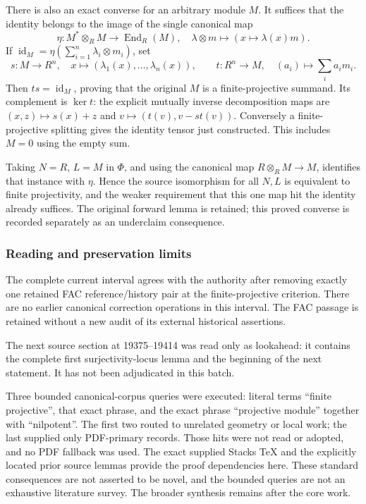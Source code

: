 There is also an exact converse for an arbitrary module \(M\). It suffices that the identity belongs to the image of the single canonical map \[
\eta:M^*\otimes_RM\longrightarrow\operatorname{End}_R(M),
\quad \lambda\otimes m\longmapsto(x\mapsto\lambda(x)m).
\] If \(\operatorname{id}_M=\eta(\sum_{i=1}^n\lambda_i\otimes m_i)\), set \[
s:M\to R^n,\quad x\mapsto(\lambda_1(x),\ldots,\lambda_n(x)),
\qquad
t:R^n\to M,\quad(a_i)\mapsto\sum_i a_i m_i.
\] Then \(ts=\operatorname{id}_M\), proving that the original \(M\) is a finite-projective summand. Its complement is \(\ker t\): the explicit mutually inverse decomposition maps are \((x,z)\mapsto s(x)+z\) and \(v\mapsto(t(v),v-st(v))\). Conversely a finite-projective splitting gives the identity tensor just constructed. This includes \(M=0\) using the empty sum.

Taking \(N=R\), \(L=M\) in \(\Phi\), and using the canonical map \(R\otimes_RM\to M\), identifies that instance with \(\eta\). Hence the source isomorphism for all \(N,L\) is equivalent to finite projectivity, and the weaker requirement that this one map hit the identity already suffices. The original forward lemma is retained; this proved converse is recorded separately as an underclaim consequence.

\subsubsection{Reading and preservation limits}\label{reading-and-preservation-limits}

The complete current interval agrees with the authority after removing exactly one retained FAC reference/history pair at the finite-projective criterion. There are no earlier canonical correction operations in this interval. The FAC passage is retained without a new audit of its external historical assertions.

The next source section at 19375--19414 was read only as lookahead: it contains the complete first surjectivity-locus lemma and the beginning of the next statement. It has not been adjudicated in this batch.

Three bounded canonical-corpus queries were executed: literal terms ``finite projective'', that exact phrase, and the exact phrase ``projective module'' together with ``nilpotent''. The first two routed to unrelated geometry or local work; the last supplied only PDF-primary records. Those hits were not read or adopted, and no PDF fallback was used. The exact supplied Stacks TeX and the explicitly located prior source lemmas provide the proof dependencies here. These standard consequences are not asserted to be novel, and the bounded queries are not an exhaustive literature survey. The broader synthesis remains after the core work.
